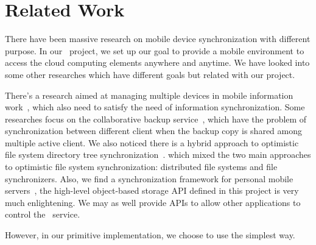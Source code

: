 \section{Related Work}
\label{sec:Related}
There have been massive research on mobile device synchronization with different purpose. In our \teledroid\ project, 
we set up our goal to provide a mobile environment to access the cloud computing elements anywhere and anytime. We have 
looked into some other researches which have different goals but related with our project.

There's a research aimed at managing multiple devices in mobile information work~\cite{Oulasvirta:2007p1727}, which 
also need to satisfy the need of information synchronization. Some researches focus on the collaborative backup 
service~\cite{Courtes:2006p1734}, which have the problem of synchronization between different client when the backup 
copy is shared among multiple active client. We also noticed there is a hybrid approach to optimistic file system 
directory tree synchronization~\cite{Lindholm:2005p1760}. which mixed the two main approaches to optimistic file system 
synchronization: distributed file systems and file synchronizers. Also, we find a synchronization framework for personal mobile servers~\cite{Sinitsyn:2004p1738}, the high-level object-based storage API defined in this 
project is very much enlightening. We may as well provide APIs to allow other applications to control the \teledroid\ service.

However, in our primitive implementation, we choose to use the simplest way.